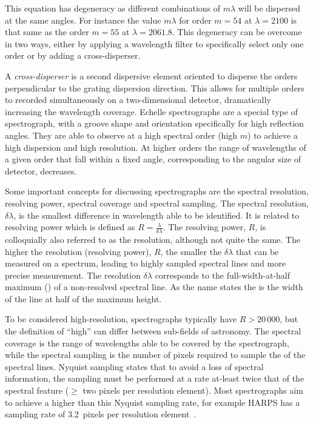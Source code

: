 This equation has degeneracy as different combinations of \(m \lambda\) will be dispersed at the same angles.
For instance the value \(m \lambda\) for order \(m=54\) at \(\lambda=2100\)\nm{} is that same as the order \(m=55\) at \(\lambda=2061.8\)\nm{}.
This degeneracy can be overcome in two ways, either by applying a wavelength filter to specifically select only one order or by adding a cross-disperser.

A \emph{cross-disperser} is a second dispersive element oriented to disperse the orders perpendicular to the grating dispersion direction.
This allows for multiple orders to recorded simultaneously on a two-dimensional detector, dramatically increasing the wavelength coverage.
Echelle spectrographs are a special type of spectrograph, with a groove shape and orientation specifically for high reflection angles.
They are able to observe at a high spectral order (high \(m\)) to achieve a high dispersion and high resolution.
At higher orders the range of wavelengths of a given order that fall within a fixed angle, corresponding to the angular size of detector, decreases.

Some important concepts for discussing spectrographs are the spectral resolution, resolving power, spectral coverage and spectral sampling.
The spectral resolution, \(\delta \lambda\), is the smallest difference in wavelength able to be identified.
It is related to resolving power which is defined as \(R=\frac{\lambda}{\delta\lambda}\).
The resolving power, \(R\), is colloquially also referred to as the resolution, although not quite the same.
The higher the resolution (resolving power), \(R\), the smaller the \(\delta\lambda\) that can be measured on a spectrum, leading to highly sampled spectral lines and more precise measurement.
The resolution \(\delta\lambda\) corresponds to the full-width-at-half maximum (\fwhm{}) of a non-resolved spectral line.
As the name states the \fwhm{} is the width of the line at half of the maximum height.

To be considered high-resolution, spectrographs typically have \(R>20\,000\), but the definition of ``high'' can differ between sub-fields of astronomy.
The spectral coverage is the range of wavelengths able to be covered by the spectrograph, while the spectral sampling is the number of pixels required to sample the \fwhm{} of the spectral lines.
Nyquist sampling states that to avoid a loss of spectral information, the sampling must be performed at a rate at-least twice that of the spectral feature (\(\ge\) two pixels per resolution element).
Most spectrographs aim to achieve a higher than this Nyquist sampling rate, for example {HARPS} has a sampling rate of 3.2~pixels per resolution element~\citep{pepe_setting_2003}.

